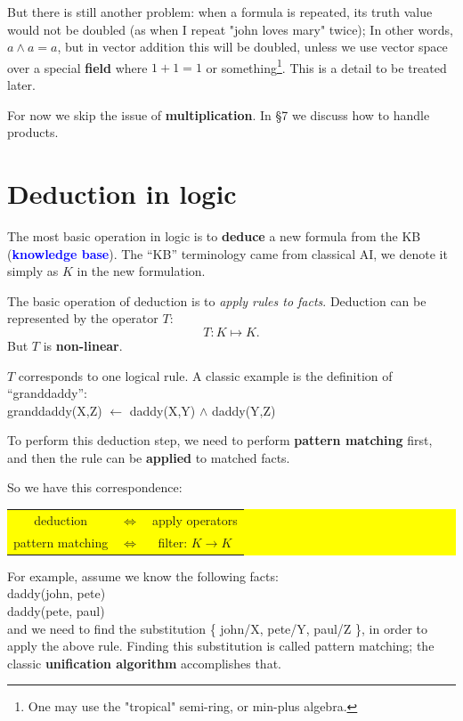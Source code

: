 \documentclass[12pt]{article}
\newcommand{\concept}[1]{\textbf{\textcolor{blue}{#1}}}
\newcommand{\formula}[1]{\textcolor{LogicColor}{#1}}
\newcommand{\tab}{\hspace*{1cm}}
\begin{document}
But there is still another problem:  when a formula is repeated, its truth value would not be doubled (as when I repeat "john loves mary" twice);  In other words, $a \wedge a = a$, but in vector addition this will be doubled, unless we use vector space over a special \textbf{field} where $ 1 + 1 = 1 $ or something\footnote{ One may use the "tropical" semi-ring, or min-plus algebra.}.  This is a detail to be treated later.

For now we skip the issue of \textbf{multiplication}.  In \S 7 we discuss how to handle products.

\section{Deduction in logic}

The most basic operation in logic is to \textbf{deduce} a new formula from the KB (\concept{knowledge base}).  The ``KB'' terminology came from classical AI, we denote it simply as $K$ in the new formulation.

The basic operation of deduction is to \textit{apply rules to facts}.  Deduction can be represented by the operator $T$:
$$ T: K \mapsto K .$$
But $T$ is \textbf{non-linear}.

$T$ corresponds to one logical rule.  A classic example is the definition of ``granddaddy'':\\
\tab \formula{ granddaddy(X,Z) $\leftarrow$ daddy(X,Y) $\wedge$ daddy(Y,Z)}

To perform this deduction step, we need to perform \textbf{pattern matching} first, and then the rule can be \textbf{applied} to matched facts.

So we have this correspondence:
\begin{center}
\colorbox{yellow}{\parbox{0.55\textwidth}{
\begin{tabular}{ccc}
deduction & $\Leftrightarrow$ & apply operators \\
pattern matching & $\Leftrightarrow$ & filter: $K \rightarrow K$ \\ 
\end{tabular}
}}
\end{center}

For example, assume we know the following facts:\\
\tab \formula{daddy(john, pete)} \\
\tab \formula{daddy(pete, paul)} \\
and we need to find the substitution \{ john/X, pete/Y, paul/Z \}, in order to apply the above rule.  Finding this substitution is called pattern matching; the classic \textbf{unification algorithm} accomplishes that.
\end{document}
